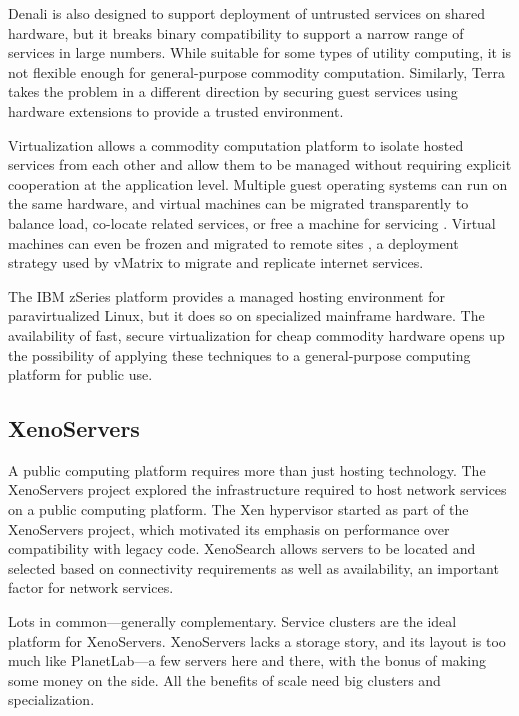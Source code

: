 Denali \cite{whitaker02} is also designed to support deployment of untrusted services on shared hardware, but it breaks binary compatibility to support a narrow range of services in large numbers. While suitable for some types of utility computing, it is not flexible enough for general-purpose commodity computation. Similarly, Terra \cite{garfinkel} takes the problem in a different direction by securing guest services using hardware extensions to provide a trusted environment.

Virtualization allows a commodity computation platform to isolate hosted services from each other and allow them to be managed without requiring explicit cooperation at the application level. Multiple guest operating systems can run on the same hardware, and virtual machines can be migrated transparently to balance load, co-locate related services, or free a machine for servicing \cite{clark}. Virtual machines can even be frozen and migrated to remote sites \cite{sapuntzakis02}, a deployment strategy used by vMatrix \cite{awadallah} to migrate and replicate internet services.

The IBM zSeries \cite{ibmzseries} platform provides a managed hosting environment for paravirtualized Linux, but it does so on specialized mainframe hardware. The availability of fast, secure virtualization for cheap commodity hardware opens up the possibility of applying these techniques to a general-purpose computing platform for public use.

\subsection{XenoServers}

A public computing platform requires more than just hosting technology. The XenoServers project \cite{reed,kotsovinos04a} explored the infrastructure required to host network services on a public computing platform. The Xen hypervisor started as part of the XenoServers project, which motivated its emphasis on performance over compatibility with legacy code. XenoSearch \cite{spence} allows servers to be located and selected based on connectivity requirements as well as availability, an important factor for network services.

Lots in common---generally complementary. Service clusters are the ideal platform for XenoServers. XenoServers lacks a storage story, and its layout is too much like PlanetLab---a few servers here and there, with the bonus of making some money on the side. All the benefits of scale need big clusters and specialization.

